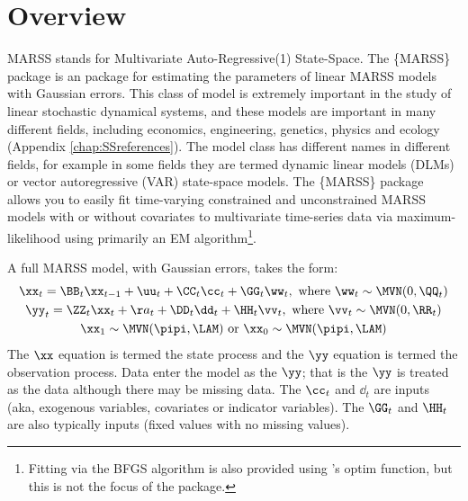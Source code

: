 \chapter{Overview}
\label{chap:intro}

MARSS stands for Multivariate Auto-Regressive(1) State-Space. The \{MARSS\} package is an \R package for estimating the parameters of linear MARSS models with Gaussian errors.  This class of model is extremely important in the study of linear stochastic dynamical systems, and these models are important in many different fields, including economics, engineering, genetics, physics and ecology (Appendix \ref{chap:SSreferences}).  The model class has different names in different fields, for example in some fields they are termed dynamic linear models (DLMs) or vector autoregressive (VAR) state-space models.  The \{MARSS\} package allows you to easily fit time-varying constrained and unconstrained MARSS models with or without covariates to multivariate time-series data via maximum-likelihood using primarily an EM algorithm\footnote{Fitting via the BFGS algorithm is also provided using \R's optim function, but this is not the focus of the package.}.

A full MARSS model, with Gaussian errors, takes the form:
\begin{subequations}\label{eqn:marss}
\begin{gather}
\xx_t = \BB_t\xx_{t-1} + \uu_t + \CC_t\cc_t + \GG_t\ww_t, \text{ where } \ww_t \sim \MVN(0,\QQ_t) \label{eqn:marssx}\\
\yy_t = \ZZ_t\xx_t + \aa_t + \DD_t\dd_t + \HH_t\vv_t, \text{ where } \vv_t \sim \MVN(0,\RR_t) \label{eqn:marssy}\\
\xx_1 \sim \MVN(\pipi,\LAM) \text{ or } \xx_0 \sim \MVN(\pipi,\LAM)\label{eqn:marssx1}
\end{gather}
\end{subequations}
The $\xx$ equation is termed the state process and the $\yy$ equation is termed the observation process.  Data enter the model as the $\yy$; that is the $\yy$ is treated as the data although there may be missing data.  The $\cc_t$ and $\dd_t$ are inputs (aka, exogenous variables, covariates or indicator variables).  The $\GG_t$ and $\HH_t$ are also typically inputs (fixed values with no missing values).

